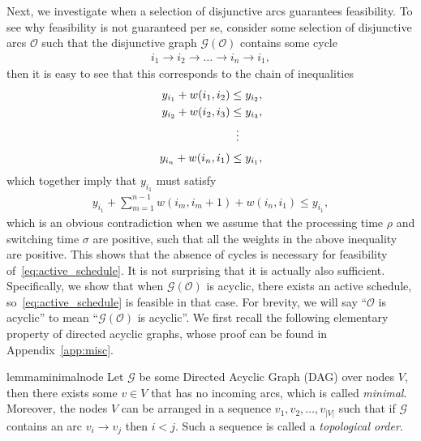 \documentclass[a4paper]{report}
\theoremstyle{definition}
\theoremstyle{plain}
\begin{document}
Next, we investigate when a selection of disjunctive arcs guarantees
feasibility.
%
To see why feasibility is not guaranteed per se, consider some selection of
disjunctive arcs $\mathcal{O}$ such that the disjunctive graph $\mathcal{G}(\mathcal{O})$
contains some cycle
\begin{align*}
 i_1 \rightarrow i_2 \rightarrow \dots \rightarrow i_n \rightarrow i_1,
\end{align*}
%
then it is easy to see that this corresponds to the chain of inequalities
\begin{align*}
  y_{i_1} + w(i_1,i_2) &\leq y_{i_2} ,\\
  y_{i_2} + w(i_2,i_3) &\leq y_{i_3} ,\\
  &\vdotswithin{=} \notag \\[0.3em]
  y_{i_n} + w(i_n,i_1) &\leq y_{i_1} ,
\end{align*}
%
which together imply that $y_{i_1}$ must satisfy
\begin{align*}
  y_{i_1} + \sum_{m=1}^{n-1} w(i_m, i_m+1) + w(i_n, i_1) \leq y_{i_1} ,
\end{align*}
which is an obvious contradiction when we assume that the processing time $\rho$
and switching time $\sigma$ are positive, such that all the weights in the above
inequality are positive.
%
This shows that the absence of cycles is necessary for feasibility
of~\eqref{eq:active_schedule}. It is not surprising that it is actually also sufficient.
%
Specifically, we show that when $\mathcal{G}(\mathcal{O})$ is acyclic, there exists an
active schedule, so~\eqref{eq:active_schedule} is feasible in that case.
%
For brevity, we will say ``$\mathcal{O}$ is acyclic'' to mean ``$\mathcal{G}(\mathcal{O})$
is acyclic''.
%
We first recall the following elementary property of directed acyclic graphs,
whose proof can be found in Appendix~\ref{app:misc}.

\begin{restatable}{lemma}{minimalnode}\label{lemma:minimal-node}
  Let $\mathcal{G}$ be some Directed Acyclic Graph (DAG) over nodes $V$, then
  there exists some $v \in V$ that has no incoming arcs, which is called
  \emph{minimal}. Moreover, the nodes $V$ can be arranged in a sequence
  $v_1, v_2, \dots, v_{|V|}$ such that if $\mathcal{G}$ contains an arc
  $v_i \rightarrow v_j$ then $i < j$. Such a sequence is called a
  \emph{topological order}.
\end{restatable}
\end{document}
